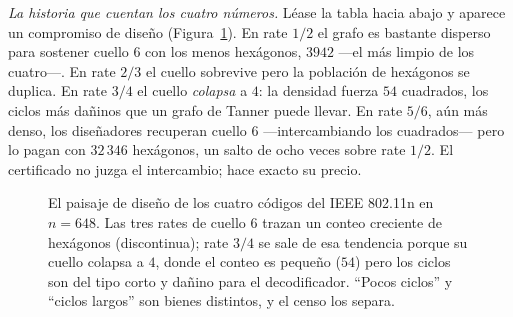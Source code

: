 \documentclass[11pt]{article}
\begin{document}
\emph{La historia que cuentan los cuatro números.} Léase la tabla hacia abajo y aparece un
compromiso de diseño (Figura~\ref{fig:tradeoff}). En rate $1/2$ el grafo es bastante disperso
para sostener cuello $6$ con los menos hexágonos, $3942$ ---el más limpio de los cuatro---. En
rate $2/3$ el cuello sobrevive pero la población de hexágonos se duplica. En rate $3/4$ el
cuello \emph{colapsa} a $4$: la densidad fuerza $54$ cuadrados, los ciclos más dañinos que un
grafo de Tanner puede llevar. En rate $5/6$, aún más denso, los diseñadores recuperan cuello
$6$ ---intercambiando los cuadrados--- pero lo pagan con $32\,346$ hexágonos, un salto de
ocho veces sobre rate $1/2$. El certificado no juzga el intercambio; hace exacto su precio.

\begin{figure}[t]
\centering
{}
\caption{El paisaje de diseño de los cuatro códigos del IEEE 802.11n en $n = 648$. Las tres
rates de cuello $6$ trazan un conteo creciente de hexágonos (discontinua); rate $3/4$ se sale
de esa tendencia porque su cuello colapsa a $4$, donde el conteo es pequeño ($54$) pero los
ciclos son del tipo corto y dañino para el decodificador. ``Pocos ciclos'' y ``ciclos
largos'' son bienes distintos, y el censo los separa.}
\label{fig:tradeoff}
\end{figure}
\end{document}
